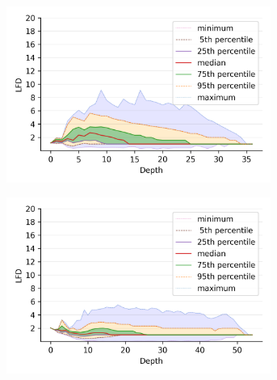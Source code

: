 \begin{figure}
    \captionsetup[subfigure]{aboveskip=-15pt,belowskip=-3pt}
    \begin{subfigure}[b]{0.47\textwidth}
        \includegraphics[width=0.95\textwidth]{images/lfd/fashion-mnist.png}\\
        \label{fig:results:fashion-mnist-lfd}
    \end{subfigure}%
    \begin{subfigure}[b]{0.47\textwidth}
        \includegraphics[width=0.95\textwidth]{images/lfd/glove-25.png}\\
        \label{fig:results:glove-25-lfd}
    \end{subfigure}
    \\
    \begin{subfigure}[b]{0.47\textwidth}

\end{subfigure}
\end{figure}
